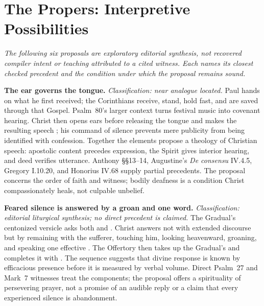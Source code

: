 \sectionguard
\section*{The Propers: Interpretive Possibilities}

\noindent\emph{The following six proposals are exploratory editorial
synthesis, not recovered compiler intent or teaching attributed to a cited
witness. Each names its closest checked precedent and the condition under which
the proposal remains sound.}

\noindent\textbf{The ear governs the tongue.\enspace{}}
\emph{Classification: near analogue located.} Paul hands on what he first
received; the Corinthians receive, stand, hold fast, and are saved through that
Gospel. Psalm~80's larger context turns festival music into covenant hearing.
Christ then opens ears before releasing the tongue and makes the resulting
speech ; his command of silence prevents mere publicity from being
identified with confession. Together the elements propose a theology of
Christian speech: apostolic content precedes expression, the Spirit gives
interior hearing, and deed verifies utterance. Anthony §§13--14, Augustine's
\emph{De consensu} IV.4.5, Gregory I.10.20, and Honorius IV.68 supply partial
precedents. The proposal concerns the order of faith and witness; bodily
deafness is a condition Christ compassionately heals, not culpable unbelief.

\noindent\textbf{Feared silence is answered by a groan and one word.\enspace{}}
\emph{Classification: editorial liturgical synthesis; no direct precedent is
claimed.} The Gradual's
centonized versicle asks both  and .
Christ answers not with extended discourse but by remaining with the sufferer,
touching him, looking heavenward, groaning, and speaking one effective
. The Offertory then takes up the Gradual's
 and completes it with . The sequence suggests
that divine response is known by efficacious presence before it is measured by
verbal volume. Direct Psalm~27 and Mark~7 witnesses treat the components; the
proposal offers a spirituality of
persevering prayer, not a promise of an audible reply or a claim that every
experienced silence is abandonment.

